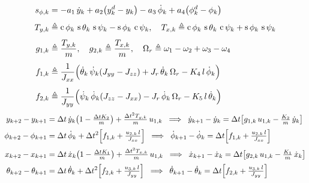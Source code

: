 \documentclass[conf]{new-aiaa}
\DeclareMathOperator{\s}{s}
\DeclareMathOperator{\cs}{c}
\begin{document}
\begin{samepage}
    \begingroup
\small
\begin{align}
s_{\phi,k}
&= -a_1\,\dot y_k
+ a_2\!\left(y_k^d - y_k\right)
- a_3\,\dot\phi_k
+ a_4\!\left(\phi_k^d - \phi_k\right) \notag \\[4pt]
T_{y,k} &\triangleq
\cs\phi_k\,\s\theta_k\,\s\psi_k
- \s\phi_k\,\cs\psi_k,
\quad T_{x,k} \triangleq
\cs\phi_k\,\s\theta_k\,\cs\psi_k
+ \s\phi_k\,\s\psi_k \notag \\[4pt]
g_{1,k} &\triangleq \frac{T_{y,k}}{m}, \quad
g_{2,k} \triangleq \frac{T_{x,k}}{m}, \quad
\Omega_r \triangleq \omega_1 - \omega_2 + \omega_3 - \omega_4 \notag \\[4pt]
f_{1,k} &\triangleq \frac{1}{J_{xx}}\Bigl(
\dot\theta_k\,\dot\psi_k\!\left(J_{yy} - J_{zz}\right)
 + J_r\,\dot\theta_k\,\Omega_r
 - K_4\,l\,\dot\phi_k
\Bigr) \notag \\[4pt]
f_{2,k} &\triangleq \frac{1}{J_{yy}}\Bigl(
\dot\psi_k\,\dot\phi_k\!\left(J_{zz} - J_{xx}\right)
 - J_r\,\dot\phi_k\,\Omega_r
 - K_5\,l\,\dot\theta_k
\Bigr)
\end{align}
\begin{align}
y_{k+2} - y_{k+1}
&= \Delta t\,\dot y_k\!\left(1 - \tfrac{\Delta t K_2}{m}\right) + \tfrac{\Delta t^2 T_{y,k}}{m}\,u_{1,k}
\;\;\Longrightarrow\;\; \dot y_{k+1} - \dot y_k = \Delta t\!\left[ g_{1,k}\,u_{1,k} - \tfrac{K_2}{m}\,\dot y_k \right] \notag \\[2pt]
\phi_{k+2} - \phi_{k+1}
&= \Delta t\,\dot\phi_k + \Delta t^2\!\left[ f_{1,k} + \tfrac{u_{2,k}\,l}{J_{xx}} \right]
\;\;\Longrightarrow\;\; \dot\phi_{k+1} - \dot\phi_k = \Delta t\!\left[ f_{1,k} + \tfrac{u_{2,k}\,l}{J_{xx}} \right] \notag \\[2pt]
x_{k+2} - x_{k+1}
&= \Delta t\,\dot x_k\!\left(1 - \tfrac{\Delta t K_1}{m}\right) + \tfrac{\Delta t^2 T_{x,k}}{m}\,u_{1,k}
\;\;\Longrightarrow\;\; \dot x_{k+1} - \dot x_k = \Delta t\!\left[ g_{2,k}\,u_{1,k} - \tfrac{K_1}{m}\,\dot x_k \right] \notag \\[2pt]
\theta_{k+2} - \theta_{k+1}
&= \Delta t\,\dot\theta_k + \Delta t^2\!\left[ f_{2,k} + \tfrac{u_{3,k}\,l}{J_{yy}} \right]
\;\;\Longrightarrow\;\; \dot\theta_{k+1} - \dot\theta_k = \Delta t\!\left[ f_{2,k} + \tfrac{u_{3,k}\,l}{J_{yy}} \right]

\end{align}
\end{samepage}
\end{document}
